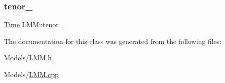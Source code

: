 \subsubsection{\texorpdfstring{tenor\+\_\+}{tenor\_}}
{\footnotesize\ttfamily \hyperlink{_name_def_8h_ac2d3e0ba793497bcca555c7c2cf64ff3}{Time} L\+M\+M\+::tenor\+\_\+\hspace{0.3cm}{\ttfamily [private]}}



The documentation for this class was generated from the following files\+:\begin{DoxyCompactItemize}
\item 
Models/\hyperlink{_l_m_m_8h}{L\+M\+M.\+h}\item 
Models/\hyperlink{_l_m_m_8cpp}{L\+M\+M.\+cpp}\end{DoxyCompactItemize}
